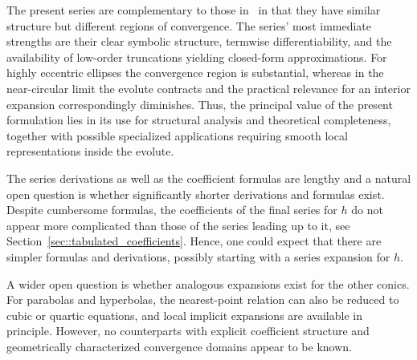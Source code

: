 \documentclass[a4paper]{amsart}
\begin{document}
The present series are complementary to those in~\cite{Nilsson2025} in that they have similar structure but different regions of convergence. The series' most immediate strengths are their clear symbolic structure, termwise differentiability, %
and the availability of low-order truncations yielding closed-form approximations.
%
For highly eccentric ellipses the convergence region is substantial, whereas in the near-circular limit the evolute contracts and the practical relevance for an interior expansion correspondingly diminishes. Thus, the principal value of the present formulation lies in its use for structural analysis and theoretical completeness, together with possible specialized applications requiring smooth local representations inside the evolute.

The series derivations as well as the coefficient formulas are lengthy and a natural open question is whether significantly shorter derivations and formulas exist. Despite cumbersome formulas, the coefficients of the final series for $h$ do not appear more complicated than those of the series leading up to it, see Section~\ref{sec::tabulated_coefficients}. Hence, one could expect that there are simpler formulas and derivations, possibly starting with a series expansion for $h$.

A wider open question is whether analogous expansions exist for the other conics. For parabolas and hyperbolas, the nearest-point relation can also be reduced to cubic or quartic equations, and local implicit expansions are available in principle. However, no counterparts with explicit coefficient structure and geometrically characterized convergence domains appear to be known.


\end{document}
